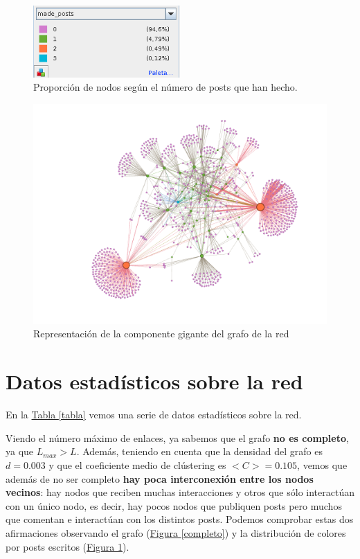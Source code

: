 \documentclass[10pt,a4paper,spanish]{article}
\numberwithin{equation}{section} %
\numberwithin{figure}{section} %
\numberwithin{table}{section} %
\begin{document}
\begin{figure}[!h]
    \centering
    \includegraphics[width=0.5\textwidth]{3}
    \caption{Proporción de nodos según el número de posts que han hecho.}
    \label{proporcion}
\end{figure}

\begin{figure}[!h]
    \centering
    \includegraphics[width=\textwidth]{2}
    \caption{Representación de la componente gigante del grafo de la red}
    \label{conexa}
\end{figure}

\section{Datos estadísticos sobre la red}\label{sec:estadistica}

En la \hyperref[tabla]{Tabla \ref*{tabla}} vemos una serie de datos estadísticos sobre la red. 

Viendo el número máximo de enlaces, ya sabemos que el grafo \textbf{no es completo}, ya que $L_{max} > L$. Además, teniendo en cuenta que la densidad del grafo es $d = 0.003$ y que el coeficiente medio de clústering es $<C> = 0.105$, vemos que además de no ser completo \textbf{hay poca interconexión entre los nodos vecinos}: hay nodos que reciben muchas interacciones y otros que sólo interactúan con un único nodo, es decir, hay pocos nodos que publiquen posts pero muchos que comentan e interactúan con los distintos posts. Podemos comprobar estas dos afirmaciones observando el grafo (\hyperref[completo]{Figura \ref*{completo}}) y la distribución de colores por posts escritos (\hyperref[proporcion]{Figura \ref*{proporcion}}). 
\end{document}
